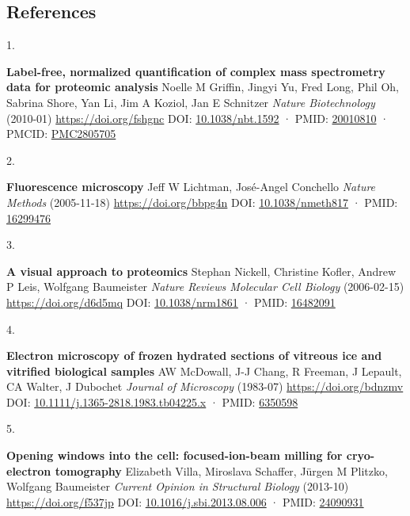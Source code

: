 \documentclass[
]{article}
\newlength{\cslhangindent}
\newlength{\csllabelwidth}
\newlength{\cslentryspacingunit} %
\newenvironment{CSLReferences}[2] %
 {%
  \setlength{\parindent}{0pt}
  \ifodd #1
  \let\oldpar\par
  \def\par{\hangindent=\cslhangindent\oldpar}
  \fi
  \setlength{\parskip}{#2\cslentryspacingunit}
 }%
 {}
\newcommand{\CSLBlock}[1]{#1\hfill\break}
\newcommand{\CSLLeftMargin}[1]{\parbox[t]{\csllabelwidth}{#1}}
\newcommand{\CSLRightInline}[1]{\parbox[t]{\linewidth - \csllabelwidth}{#1}\break}
\begin{document}
\hypertarget{references}{%
\subsection{References}\label{references}}

\hypertarget{refs}{}
\begin{CSLReferences}{0}{0}
\leavevmode{}%
\CSLLeftMargin{1. }
\CSLRightInline{\textbf{Label-free, normalized quantification of complex mass spectrometry data for proteomic analysis}
\CSLBlock{Noelle M Griffin, Jingyi Yu, Fred Long, Phil Oh, Sabrina Shore, Yan Li, Jim A Koziol, Jan E Schnitzer} \emph{Nature Biotechnology} (2010-01) \url{https://doi.org/fshgnc}
\CSLBlock{DOI: \href{https://doi.org/10.1038/nbt.1592}{10.1038/nbt.1592} · PMID: \href{https://www.ncbi.nlm.nih.gov/pubmed/20010810}{20010810} · PMCID: \href{https://www.ncbi.nlm.nih.gov/pmc/articles/PMC2805705}{PMC2805705}}}

\leavevmode{}%
\CSLLeftMargin{2. }
\CSLRightInline{\textbf{Fluorescence microscopy}
\CSLBlock{Jeff W Lichtman, José-Angel Conchello} \emph{Nature Methods} (2005-11-18) \url{https://doi.org/bbpg4n}
\CSLBlock{DOI: \href{https://doi.org/10.1038/nmeth817}{10.1038/nmeth817} · PMID: \href{https://www.ncbi.nlm.nih.gov/pubmed/16299476}{16299476}}}

\leavevmode{}%
\CSLLeftMargin{3. }
\CSLRightInline{\textbf{A visual approach to proteomics}
\CSLBlock{Stephan Nickell, Christine Kofler, Andrew P Leis, Wolfgang Baumeister} \emph{Nature Reviews Molecular Cell Biology} (2006-02-15) \url{https://doi.org/d6d5mq}
\CSLBlock{DOI: \href{https://doi.org/10.1038/nrm1861}{10.1038/nrm1861} · PMID: \href{https://www.ncbi.nlm.nih.gov/pubmed/16482091}{16482091}}}

\leavevmode{}%
\CSLLeftMargin{4. }
\CSLRightInline{\textbf{Electron microscopy of frozen hydrated sections of vitreous ice and vitrified biological samples}
\CSLBlock{AW McDowall, J-J Chang, R Freeman, J Lepault, CA Walter, J Dubochet} \emph{Journal of Microscopy} (1983-07) \url{https://doi.org/bdnzmv}
\CSLBlock{DOI: \href{https://doi.org/10.1111/j.1365-2818.1983.tb04225.x}{10.1111/j.1365-2818.1983.tb04225.x} · PMID: \href{https://www.ncbi.nlm.nih.gov/pubmed/6350598}{6350598}}}

\leavevmode{}%
\CSLLeftMargin{5. }
\CSLRightInline{\textbf{Opening windows into the cell: focused-ion-beam milling for cryo-electron tomography}
\CSLBlock{Elizabeth Villa, Miroslava Schaffer, Jürgen M Plitzko, Wolfgang Baumeister} \emph{Current Opinion in Structural Biology} (2013-10) \url{https://doi.org/f537jp}
\CSLBlock{DOI: \href{https://doi.org/10.1016/j.sbi.2013.08.006}{10.1016/j.sbi.2013.08.006} · PMID: \href{https://www.ncbi.nlm.nih.gov/pubmed/24090931}{24090931}}}


\end{CSLReferences}
\end{document}
